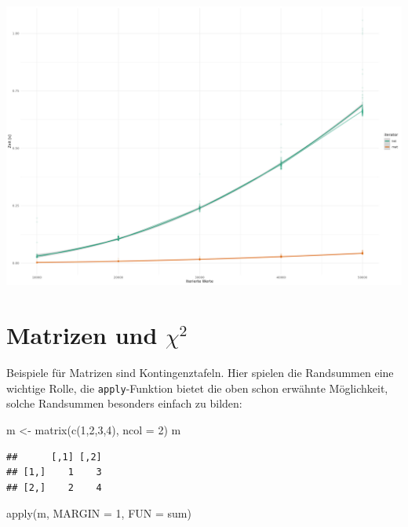 \documentclass[
]{book}
\newenvironment{Shaded}{\begin{snugshade}}{\end{snugshade}}
\newcommand{\AttributeTok}[1]{\textcolor[rgb]{0.77,0.63,0.00}{#1}}
\newcommand{\DecValTok}[1]{\textcolor[rgb]{0.00,0.00,0.81}{#1}}
\newcommand{\FunctionTok}[1]{\textcolor[rgb]{0.00,0.00,0.00}{#1}}
\newcommand{\NormalTok}[1]{#1}
\newcommand{\OtherTok}[1]{\textcolor[rgb]{0.56,0.35,0.01}{#1}}
\begin{document}
\includegraphics[width=68.06in]{imgs/list_mat_pascal}

\hypertarget{matrizen-und-chi2}{%
\section{\texorpdfstring{Matrizen und \(\chi^2\)}{Matrizen und \textbackslash chi\^{}2}}\label{matrizen-und-chi2}}

Beispiele für Matrizen sind Kontingenztafeln. Hier spielen die Randsummen eine wichtige Rolle, die \texttt{apply}-Funktion bietet die oben schon erwähnte Möglichkeit, solche Randsummen besonders einfach zu bilden:

\begin{Shaded}
\begin{Highlighting}[]
\NormalTok{m }\OtherTok{\textless{}{-}} \FunctionTok{matrix}\NormalTok{(}\FunctionTok{c}\NormalTok{(}\DecValTok{1}\NormalTok{,}\DecValTok{2}\NormalTok{,}\DecValTok{3}\NormalTok{,}\DecValTok{4}\NormalTok{), }\AttributeTok{ncol =} \DecValTok{2}\NormalTok{)}
\NormalTok{m}
\end{Highlighting}
\end{Shaded}

\begin{verbatim}
##      [,1] [,2]
## [1,]    1    3
## [2,]    2    4
\end{verbatim}

\begin{Shaded}
\begin{Highlighting}[]
\FunctionTok{apply}\NormalTok{(m, }\AttributeTok{MARGIN =} \DecValTok{1}\NormalTok{, }\AttributeTok{FUN =}\NormalTok{ sum)}
\end{Highlighting}
\end{Shaded}
\end{document}

